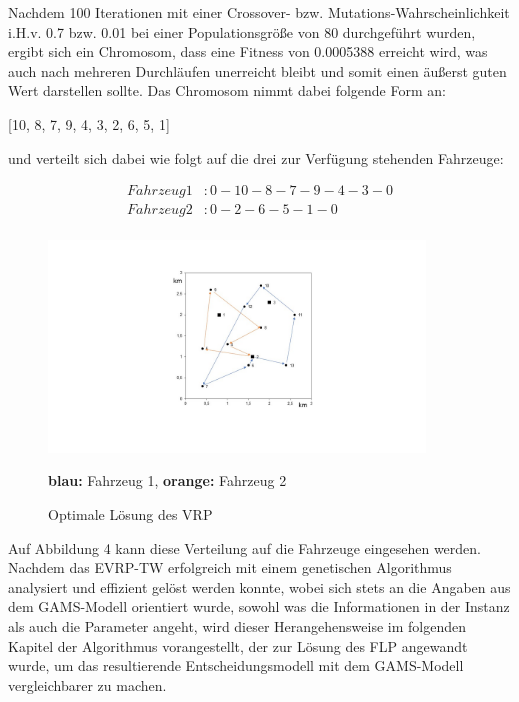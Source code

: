 \documentclass[a4paper,12pt,parskip,bibtotoc,liststotoc]{article}
\begin{document}
Nachdem 100 Iterationen mit einer Crossover- bzw. Mutations-Wahrscheinlichkeit i.H.v. 0.7 bzw. 0.01 bei einer Populationsgröße von 80 durchgeführt wurden, ergibt sich ein Chromosom, dass eine Fitness von 0.0005388 erreicht wird, was auch nach mehreren Durchläufen unerreicht bleibt und somit einen äußerst guten Wert darstellen sollte.
Das Chromosom nimmt dabei folgende Form an: 

\begin{center}
[10, 8, 7, 9, 4, 3, 2, 6, 5, 1]
\end{center}

und verteilt sich dabei wie folgt auf die drei zur Verfügung stehenden Fahrzeuge: 


\begin{equation} \label{eq:test}
    \begin{aligned} 
         Fahrzeug 1&: 0 - 10 - 8 - 7 - 9 - 4 - 3 - 0 \\
        Fahrzeug 2&: 0 - 2 - 6 - 5 - 1 - 0\\
    \end{aligned}
\end{equation}


\begin{figure}[h!]
  \begin{center}
    \includegraphics[width=100mm]{vrp222.jpg}
    \caption{Optimale Lösung des VRP}  \label{Typen}
	{\footnotesize \textbf{blau:} Fahrzeug 1, \textbf{orange:} Fahrzeug 2}
  \end{center}
\end{figure}


Auf Abbildung 4 kann diese Verteilung auf die Fahrzeuge eingesehen werden.\\

Nachdem das EVRP-TW erfolgreich mit einem genetischen Algorithmus analysiert und effizient gelöst werden konnte, wobei sich stets an die Angaben aus dem GAMS-Modell orientiert wurde, sowohl was die Informationen in der Instanz als auch die Parameter angeht, wird dieser Herangehensweise im folgenden Kapitel der Algorithmus vorangestellt, der zur Lösung des FLP angewandt wurde, um das resultierende Entscheidungsmodell mit dem GAMS-Modell vergleichbarer zu machen.
\end{document}

